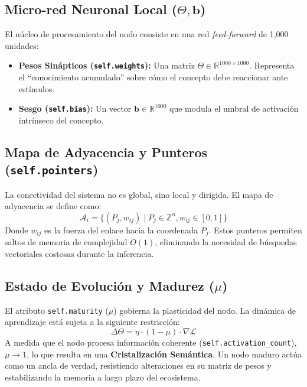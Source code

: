 \documentclass[12pt]{article}
\begin{document}
\subsection{Micro-red Neuronal Local ($\Theta, \bm{b}$)}
El núcleo de procesamiento del nodo consiste en una red \textit{feed-forward} de 1,000 unidades:
\begin{itemize}
    \item \textbf{Pesos Sinápticos (\texttt{self.weights}):} Una matriz $\Theta \in \mathbb{R}^{1000 \times 1000}$. Representa el ``conocimiento acumulado'' sobre cómo el concepto debe reaccionar ante estímulos.
    \item \textbf{Sesgo (\texttt{self.bias}):} Un vector $\bm{b} \in \mathbb{R}^{1000}$ que modula el umbral de activación intrínseco del concepto.
\end{itemize}



\subsection{Mapa de Adyacencia y Punteros (\texttt{self.pointers})}
La conectividad del sistema no es global, sino local y dirigida. El mapa de adyacencia se define como:
\begin{equation}
    \mathcal{A}_i = \{ (P_j, w_{ij}) \mid P_j \in \mathbb{Z}^n, w_{ij} \in [0, 1] \}
\end{equation}
Donde $w_{ij}$ es la fuerza del enlace hacia la coordenada $P_j$. Estos punteros permiten saltos de memoria de complejidad $O(1)$, eliminando la necesidad de búsquedas vectoriales costosas durante la inferencia.



\subsection{Estado de Evolución y Madurez ($\mu$)}
El atributo \texttt{self.maturity} ($\mu$) gobierna la plasticidad del nodo. La dinámica de aprendizaje está sujeta a la siguiente restricción:
\begin{equation}
    \Delta \Theta = \eta \cdot (1 - \mu) \cdot \nabla \mathcal{L}
\end{equation}
A medida que el nodo procesa información coherente (\texttt{self.activation\_count}), $\mu \to 1$, lo que resulta en una \textbf{Cristalización Semántica}. Un nodo maduro actúa como un ancla de verdad, resistiendo alteraciones en su matriz de pesos y estabilizando la memoria a largo plazo del ecosistema.
\end{document}
